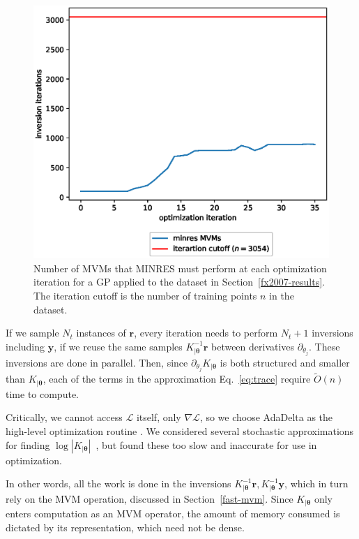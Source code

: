 \documentclass{article}
\def\bsth{{\boldsymbol\theta}}
\def \mcL {\mathcal{L}}
\def\Ty{\textbf{y}}
\def\tbr{\textbf{r}}
\newcommand{\abs}[1]{\left|#1\right|}
\begin{document}
\begin{figure}[!ht]
\vskip 0.1in
\begin{center}
\centerline{\includegraphics[width=\columnwidth]{iterations.eps}}
\caption{Number of MVMs that MINRES must perform at each optimization iteration for a GP applied to the dataset in Section~\ref{fx2007-results}. The iteration cutoff is the number of training points $n$ in the dataset.
}
\label{fx2007-iterations}
\end{center}
\vskip -0.1in
\end{figure}

If we sample $N_t$ instances of $\tbr$, every iteration needs to perform $N_t+1$ inversions including $\Ty$, if we reuse the same samples $K_{|\bsth}^{-1}\tbr$ between derivatives $\partial_{\theta_j}$. These inversions are done in parallel. Then, since $\partial_{\theta_j}K_{|\bsth}$ is both structured and smaller than $K_{|\bsth}$, each of the terms in the approximation Eq.~\ref{eq:trace} require $\tilde{O}(n)$ time to compute.

Critically, we cannot access $\mcL$ itself, only $\nabla\mcL$, so we choose AdaDelta as the high-level optimization routine \cite{zeiler2012adadelta}. We considered several stochastic approximations for finding $\log\abs{K_{|\bsth}}$~\cite{dorn2015stochastic, han2015large}, but found these too slow and inaccurate for use in optimization.

In other words, all the work is done in the inversions $K_{|\bsth}^{-1}\tbr,K_{|\bsth}^{-1}\Ty$, which in turn rely on the MVM operation, discussed in Section~\ref{fast-mvm}. Since $K_{|\bsth}$ only enters computation as an MVM operator, the amount of memory consumed is dictated by its representation, which need not be dense.
\end{document}

